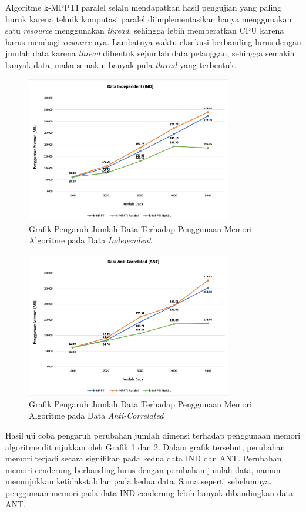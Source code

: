 Algoritme k-MPPTI paralel selalu mendapatkan hasil pengujian yang paling buruk karena teknik komputasi paralel diimplementasikan hanya menggunakan satu \textit{resource} menggunakan \textit{thread}, sehingga lebih memberatkan CPU karena harus membagi \textit{resource}-nya. Lambatnya waktu eksekusi berbanding lurus dengan jumlah data karena \textit{thread} dibentuk sejumlah data pelanggan, sehingga semakin banyak data, maka semakin banyak pula \textit{thread} yang terbentuk.

\begin{figure}[H]
	\centering
	\includegraphics[width=9cm]{assets/img/bab5/grafik-ind-jml-mem.png}
	\caption{Grafik Pengaruh Jumlah Data Terhadap Penggunaan Memori Algoritme pada Data \textit{Independent}}
	\label{fig:grafik-ind-jml-mem}
\end{figure}

\begin{figure}[H]
	\centering
	\includegraphics[width=9cm]{assets/img/bab5/grafik-ant-jml-mem.png}
	\caption{Grafik Pengaruh Jumlah Data Terhadap Penggunaan Memori Algoritme pada Data \textit{Anti-Correlated}}
	\label{fig:grafik-ant-jml-mem}
\end{figure}

Hasil uji coba pengaruh perubahan jumlah dimensi terhadap penggunaan memori algoritme ditunjukkan oleh Grafik \ref{fig:grafik-ind-jml-mem} dan \ref{fig:grafik-ant-jml-mem}. Dalam grafik tersebut, perubahan memori terjadi secara signifikan pada kedua data IND dan ANT. Perubahan memori cenderung berbanding lurus dengan perubahan jumlah data, namun menunjukkan ketidakstabilan pada kedua data.
Sama seperti sebelumnya, penggunaan memori pada data IND cenderung lebih banyak dibandingkan data ANT.

